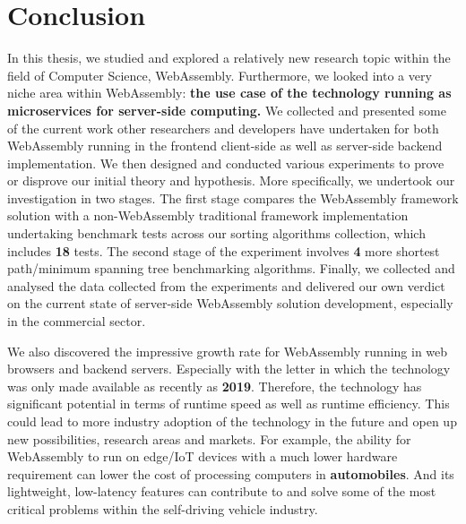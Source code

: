 \chapter{Conclusion} \label{chap:conclusion}

In this thesis, we studied and explored a relatively new research topic within the field of Computer Science, WebAssembly. Furthermore, we looked into a very niche area within WebAssembly: \textbf{the use case of the technology running as microservices for server-side computing.} We collected and presented some of the current work other researchers and developers have undertaken for both WebAssembly running in the frontend client-side as well as server-side backend implementation. We then designed and conducted various experiments to prove or disprove our initial theory and hypothesis. More specifically, we undertook our investigation in two stages. The first stage compares the WebAssembly framework solution with a non-WebAssembly traditional framework implementation undertaking benchmark tests across our sorting algorithms collection, which includes \textbf{18} tests. The second stage of the experiment involves \textbf{4} more shortest path/minimum spanning tree benchmarking algorithms. Finally, we collected and analysed the data collected from the experiments and delivered our own verdict on the current state of server-side WebAssembly solution development, especially in the commercial sector.

We also discovered the impressive growth rate for WebAssembly running in web browsers and backend servers. Especially with the letter in which the technology was only made available as recently as \textbf{2019}. Therefore, the technology has significant potential in terms of runtime speed as well as runtime efficiency. This could lead to more industry adoption of the technology in the future and open up new possibilities, research areas and markets. For example, the ability for WebAssembly to run on edge/IoT devices with a much lower hardware requirement can lower the cost of processing computers in \textbf{automobiles}. And its lightweight, low-latency features can contribute to and solve some of the most critical problems within the self-driving vehicle industry.


